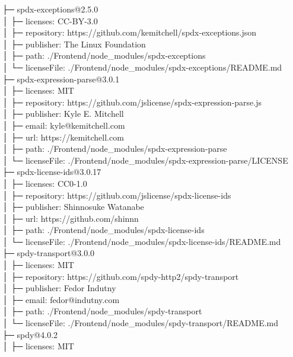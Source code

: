 \documentclass[
    paper=a4,
    twoside=false,
    parskip=half,
    listof=entryprefix,
    listof=totoc,
    index=totoc,
    bibliography=totoc,
    headsepline,
]{scrbook}
\begin{document}
    ├─ spdx-exceptions@2.5.0\\
    │  ├─ licenses: CC-BY-3.0\\
    │  ├─ repository: https://github.com/kemitchell/spdx-exceptions.json\\
    │  ├─ publisher: The Linux Foundation\\
    │  ├─ path: ./Frontend/node\_modules/spdx-exceptions\\
    │  └─ licenseFile: ./Frontend/node\_modules/spdx-exceptions/README.md\\
    ├─ spdx-expression-parse@3.0.1\\
    │  ├─ licenses: MIT\\
    │  ├─ repository: https://github.com/jslicense/spdx-expression-parse.js\\
    │  ├─ publisher: Kyle E. Mitchell\\
    │  ├─ email: kyle@kemitchell.com\\
    │  ├─ url: https://kemitchell.com\\
    │  ├─ path: ./Frontend/node\_modules/spdx-expression-parse\\
    │  └─ licenseFile: ./Frontend/node\_modules/spdx-expression-parse/LICENSE\\
    ├─ spdx-license-ids@3.0.17\\
    │  ├─ licenses: CC0-1.0\\
    │  ├─ repository: https://github.com/jslicense/spdx-license-ids\\
    │  ├─ publisher: Shinnosuke Watanabe\\
    │  ├─ url: https://github.com/shinnn\\
    │  ├─ path: ./Frontend/node\_modules/spdx-license-ids\\
    │  └─ licenseFile: ./Frontend/node\_modules/spdx-license-ids/README.md\\
    ├─ spdy-transport@3.0.0\\
    │  ├─ licenses: MIT\\
    │  ├─ repository: https://github.com/spdy-http2/spdy-transport\\
    │  ├─ publisher: Fedor Indutny\\
    │  ├─ email: fedor@indutny.com\\
    │  ├─ path: ./Frontend/node\_modules/spdy-transport\\
    │  └─ licenseFile: ./Frontend/node\_modules/spdy-transport/README.md\\
    ├─ spdy@4.0.2\\
    │  ├─ licenses: MIT\\
\end{document}
